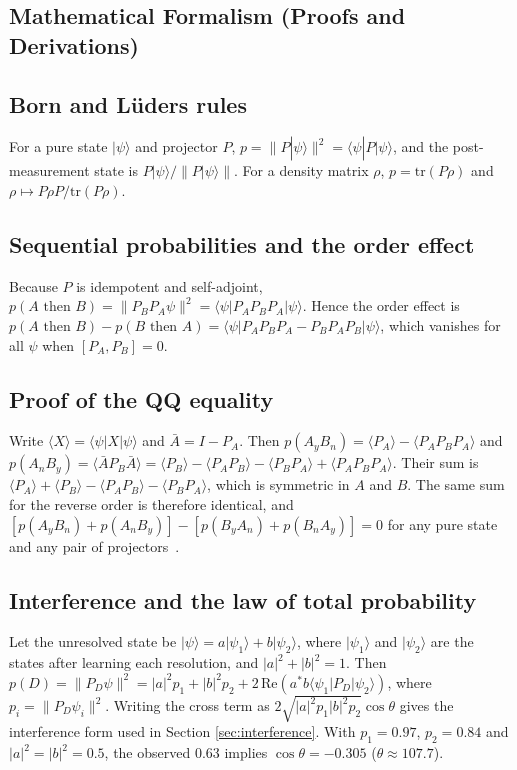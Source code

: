 \documentclass[pdflatex,sn-basic]{sn-jnl}
\newcommand{\ket}[1]{|#1\rangle}
\newcommand{\bra}[1]{\langle #1|}
\begin{document}
\begin{appendices}

\section{Mathematical Formalism (Proofs and Derivations)}\label{app:math}

\subsection{Born and L\"uders rules}\label{app:born}
For a pure state $\ket{\psi}$ and projector $P$, $p = \lVert P\ket{\psi}\rVert^2 = \bra{\psi}P\ket{\psi}$, and the post-measurement state is $P\ket{\psi}/\lVert P\ket{\psi}\rVert$. For a density matrix $\rho$, $p = \mathrm{tr}(P\rho)$ and $\rho \mapsto P\rho P / \mathrm{tr}(P\rho)$.

\subsection{Sequential probabilities and the order effect}\label{app:seq}
Because $P$ is idempotent and self-adjoint, $p(A \text{ then } B) = \lVert P_B P_A \psi\rVert^2 = \bra{\psi}P_A P_B P_A\ket{\psi}$. Hence the order effect is $p(A \text{ then } B) - p(B \text{ then } A) = \bra{\psi}P_A P_B P_A - P_B P_A P_B\ket{\psi}$, which vanishes for all $\psi$ when $[P_A, P_B] = 0$.

\subsection{Proof of the QQ equality}\label{app:qq}
Write $\langle X\rangle = \bra{\psi}X\ket{\psi}$ and $\bar{A} = I - P_A$. Then $p(A_yB_n) = \langle P_A\rangle - \langle P_A P_B P_A\rangle$ and $p(A_nB_y) = \langle \bar{A} P_B \bar{A}\rangle = \langle P_B\rangle - \langle P_A P_B\rangle - \langle P_B P_A\rangle + \langle P_A P_B P_A\rangle$. Their sum is $\langle P_A\rangle + \langle P_B\rangle - \langle P_A P_B\rangle - \langle P_B P_A\rangle$, which is symmetric in $A$ and $B$. The same sum for the reverse order is therefore identical, and $[p(A_yB_n) + p(A_nB_y)] - [p(B_yA_n) + p(B_nA_y)] = 0$ for any pure state and any pair of projectors~\citep{Wang2013b}.

\subsection{Interference and the law of total probability}\label{app:interf}
Let the unresolved state be $\ket{\psi} = a\ket{\psi_1} + b\ket{\psi_2}$, where $\ket{\psi_1}$ and $\ket{\psi_2}$ are the states after learning each resolution, and $|a|^2 + |b|^2 = 1$. Then $p(D) = \lVert P_D \psi\rVert^2 = |a|^2 p_1 + |b|^2 p_2 + 2\,\mathrm{Re}(a^{*} b \bra{\psi_1}P_D\ket{\psi_2})$, where $p_i = \lVert P_D \psi_i\rVert^2$. Writing the cross term as $2\sqrt{|a|^2 p_1 |b|^2 p_2}\cos\theta$ gives the interference form used in Section \ref{sec:interference}. With $p_1 = 0.97$, $p_2 = 0.84$ and $|a|^2 = |b|^2 = 0.5$, the observed 0.63 implies $\cos\theta = -0.305$ ($\theta \approx 107.7$\textdegree{}).


\end{appendices}
\end{document}

